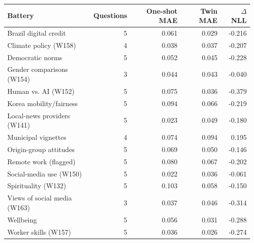 \begin{tabular}{lrrrr}\toprule
Battery & Questions & One-shot MAE & Twin MAE & $\Delta$ NLL \\
\midrule
Brazil digital credit & 5 & 0.061 & 0.029 & -0.216 \\
Climate policy (W158) & 4 & 0.038 & 0.037 & -0.207 \\
Democratic norms & 5 & 0.052 & 0.045 & -0.228 \\
Gender comparisons (W154) & 3 & 0.044 & 0.043 & -0.040 \\
Human vs. AI (W152) & 5 & 0.075 & 0.036 & -0.379 \\
Korea mobility/fairness & 5 & 0.094 & 0.066 & -0.219 \\
Local-news providers (W141) & 5 & 0.023 & 0.049 & -0.180 \\
Municipal vignettes & 4 & 0.074 & 0.094 & 0.195 \\
Origin-group attitudes & 5 & 0.069 & 0.050 & -0.146 \\
Remote work (flagged) & 5 & 0.080 & 0.067 & -0.202 \\
Social-media use (W150) & 5 & 0.022 & 0.036 & -0.061 \\
Spirituality (W132) & 5 & 0.103 & 0.058 & -0.150 \\
Views of social media (W163) & 3 & 0.037 & 0.046 & -0.314 \\
Wellbeing & 5 & 0.056 & 0.031 & -0.288 \\
Worker skills (W157) & 5 & 0.036 & 0.026 & -0.274 \\
\bottomrule\end{tabular}
